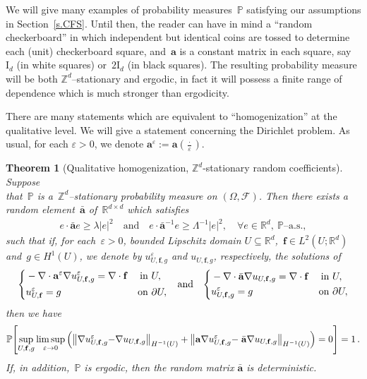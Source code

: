 \documentclass[11pt]{article} %
\numberwithin{equation}{section}
\newtheorem{theorem}{Theorem}[section]
\theoremstyle{definition}
\let\originalleft\left
\let\originalright\right
\renewcommand{\left}{\mathopen{}\mathclose\bgroup\originalleft}
\renewcommand{\right}{\aftergroup\egroup\originalright}
\newcommand*{\Id}{\ensuremath{\mathrm{I}_d}}
\newcommand*{\Z}{\ensuremath{\mathbb{Z}}}
\newcommand*{\R}{\ensuremath{\mathbb{R}}}
\newcommand*{\Zd}{\ensuremath{\mathbb{Z}^d}}
\newcommand*{\Rd}{\ensuremath{\mathbb{R}^d}}
\newcommand{\eps}{\varepsilon}
\newcommand{\f}{\mathbf{f}}
\newcommand{\ep}{\eps}
\renewcommand{\a}{\mathbf{a}}
\newcommand{\ahom}{\bar{\a}}
\newcommand{\F}{\mathcal{F}}
\renewcommand{\P}{\mathbb{P}}
\begin{document}
\smallskip

We will give many examples of probability measures~$\P$ satisfying our assumptions in Section~\ref{s.CFS}. Until then, the reader can have in mind a ``random checkerboard'' in which independent but identical coins are tossed to determine each (unit) checkerboard square, and~$\a$ is a constant matrix in each square, say~$ \Id$ (in white squares) or~$2 \Id$ (in black squares). The resulting probability measure will be both $\Zd$--stationary and ergodic, in fact it will possess a finite range of dependence which is much stronger than ergodicity. 

\smallskip

There are many statements which are equivalent to ``homogenization'' at the qualitative level. We will give a statement concerning the Dirichlet problem.
As usual, for each $\ep>0$, we denote $\a^\ep:=\a(\frac\cdot\ep)$.

\begin{theorem}[Qualitative homogenization, $\Z^d$-stationary random coefficients]
\label{t.qualitative.homogenization}
Suppose \\ that~$\P$ is a~$\Zd$--stationary probability measure on $(\Omega,\F)$.
Then there exists a random element~$\ahom$ of~$\R^{d\times d}$ which satisfies 
\begin{align*}
e\cdot \ahom e \geq \lambda |e|^2 \quad \mbox{and} \quad 
e \cdot \ahom^{-1} e 
\geq \Lambda^{-1}  |e|^2, \quad \forall e\in\Rd, \ \P\mbox{--a.s.},
\end{align*}
such that if, for each~$\ep>0$, bounded Lipschitz domain $U\subseteq\Rd$,~$\mathbf{f} \in L^2(U;\Rd)$ and~$g\in H^1(U)$, we denote by $u^\ep_{U,\f,g}$ and ${u}_{U,\f,g}$, respectively, the solutions of
\begin{align*}
\left\{
\begin{aligned}
& -\nabla \cdot \a^\ep \nabla u^\ep_{U,\f,g} = \nabla \cdot \f & \mbox{in} & \ U, \\
& u^\ep_{U,\f} = g & \mbox{on} & \ \partial U,
\end{aligned}
\right.
\quad \mbox{and} \quad 
\left\{
\begin{aligned}
& -\nabla \cdot \ahom\nabla u_{U,\f,g} = \nabla \cdot \f & \mbox{in} & \ U, \\
& u^\ep_{U,\f,g} = g & \mbox{on} & \ \partial U,
\end{aligned}
\right.
\end{align*}
then we have  
\begin{equation}
\label{e.qualhomogP}
\P \left[
\sup_{U,\f,g} 
\limsup_{\ep \to 0}\,
\Bigl(
\bigl\| \nabla u^\ep_{U,\f,g} {-} \nabla u_{U,\f,g} \bigr\|_{H^{-1}(U)}
+
\bigl\| \a \nabla u^\ep_{U,\f,g} {-}\; \ahom \nabla u_{U,\f,g} \bigr\|_{H^{-1}(U)}
\Bigr)
=0
\right] 
= 
1\,.
\end{equation}
If, in addition,~$\P$ is ergodic, then the random matrix $\ahom$ is deterministic. 
\end{theorem} 
\end{document}
